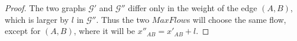 \begin{proof}
  The two graphs $\mathcal{G}'$ and $\mathcal{G}''$ differ only in the weight of the edge $\left(A, B\right)$, which is
  larger by $l$ in $\mathcal{G}''$. Thus the two $MaxFlow$s will choose the same flow, except for $\left(A, B\right)$,
  where it will be $x''_{AB} = x'_{AB} + l$.
\end{proof}
